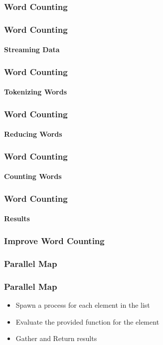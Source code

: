 \documentclass[english]{beamer}
\begin{document}
\begin{frame}
\frametitle{Word Counting}
\begin{figure}
\end{figure}
\end{frame}

\begin{frame}[fragile]
\frametitle{Word Counting}
\framesubtitle{Streaming Data}

\end{frame}

\begin{frame}[fragile]
\frametitle{Word Counting}
\framesubtitle{Tokenizing Words}

\end{frame}

\begin{frame}[fragile]
\frametitle{Word Counting}
\framesubtitle{Reducing Words}

\end{frame}

\begin{frame}[fragile]
\frametitle{Word Counting}
\framesubtitle{Counting Words}

\end{frame}

\begin{frame}[fragile]
\frametitle{Word Counting}
\framesubtitle{Results}

\end{frame}

\begin{frame}[fragile]
\frametitle{Improve Word Counting}

\end{frame}

\subsubsection{Parallel Map}
\begin{frame}
\frametitle{Parallel Map}
\begin{itemize}
\item{Spawn a process for each element in the list}
\item{Evaluate the provided function for the element}
\item{Gather and Return results}
\end{itemize}
\end{frame}
\end{document}
